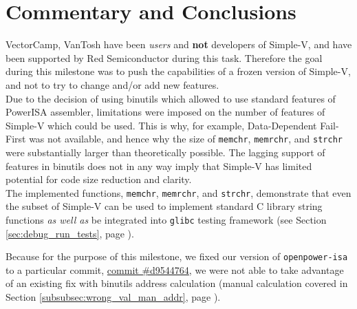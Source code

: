 \chapter{Commentary and Conclusions}

VectorCamp, VanTosh have been \textit{users} and \textbf{not} developers
of Simple-V, and have been supported by Red Semiconductor during this task.
Therefore the goal during this milestone was to push the capabilities of a
frozen version of Simple-V, and not to try to change
and/or add new features. \\

Due to the decision of using binutils which allowed to use standard features of
PowerISA assembler, limitations were imposed on the number of features of
Simple-V which could be used. This is why, for example,
Data-Dependent Fail-First was not available, and hence why the size of
\texttt{memchr}, \texttt{memrchr}, and \texttt{strchr} were
substantially larger than theoretically possible.
The lagging support of features in binutils does not in any way imply that
Simple-V has limited potential for code size reduction and clarity.\\

The implemented functions, \texttt{memchr}, \texttt{memrchr},
and \texttt{strchr}, demonstrate that even the subset of Simple-V can be used
to implement standard C library string functions \textit{as well as} be
integrated into \texttt{glibc} testing framework
(see Section \ref{sec:debug_run_tests}, page \pageref{sec:debug_run_tests}).

Because for the purpose of this milestone, we fixed our version of
\texttt{openpower-isa} to a particular commit,
\href{https://git.libre-soc.org/?p=openpower-isa.git;a=commitdiff;h=d9544764b1710f3807a9c0685d150a665f70b9a2}{commit \#d9544764},
we were not able to take advantage of an existing fix with binutils
address calculation (manual calculation covered in Section
\ref{subsubsec:wrong_val_man_addr},
page \pageref{subsubsec:wrong_val_man_addr}).